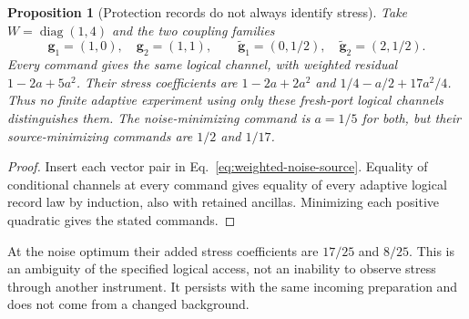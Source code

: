 \documentclass[12pt,a4paper]{article}
\newtheorem{proposition}[theorem]{Proposition}
\begin{document}
\begin{proposition}[Protection records do not always identify stress]
\label{prop:weighted-source-ambiguity}
Take $W=\operatorname{diag}(1,4)$ and the two coupling families
\[
 \mathbf g_1=(1,0),\quad\mathbf g_2=(1,1),\qquad
 \widetilde{\mathbf g}_1=(0,1/2),\quad
 \widetilde{\mathbf g}_2=(2,1/2).
\]
Every command gives the same logical channel, with weighted residual
$1-2a+5a^2$. Their stress coefficients are
$1-2a+2a^2$ and $1/4-a/2+17a^2/4$.
Thus no finite adaptive experiment using only these fresh-port logical
channels distinguishes them. The noise-minimizing command is $a=1/5$
for both, but their source-minimizing commands are $1/2$ and $1/17$.
\end{proposition}
\begin{proof}
Insert each vector pair in Eq.~\eqref{eq:weighted-noise-source}.
Equality of conditional channels at every command gives equality of every
adaptive logical record law by induction, also with retained ancillas.
Minimizing each positive quadratic gives the stated commands.
\end{proof}
At the noise optimum their added stress coefficients are $17/25$ and
$8/25$. This is an ambiguity of the specified logical access, not an
inability to observe stress through another instrument. It persists with
the same incoming preparation and does not come from a changed background.
\end{document}
